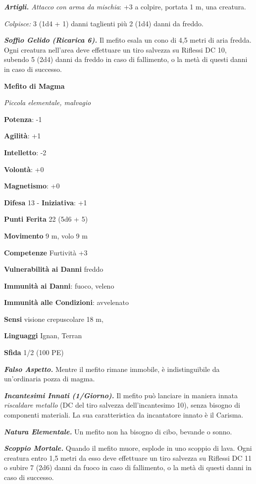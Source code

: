 \begin{multicols}{2}
\emph{\textbf{Artigli.} Attacco con arma da mischia}: +3 a colpire,
portata 1 m, una creatura.

\emph{Colpisce:} 3 (1d4 + 1) danni taglienti più 2 (1d4) danni da
freddo.

\emph{\textbf{Soffio Gelido (Ricarica 6).}} Il mefito esala un cono di
4,5 metri di aria fredda. Ogni creatura nell'area deve effettuare un
tiro salvezza su Riflessi DC 10, subendo 5 (2d4) danni da freddo in
caso di fallimento, o la metà di questi danni in caso di successo.

\textbf{Mefito di Magma}

\emph{Piccola elementale, malvagio}

\textbf{Potenza}: -1

\textbf{Agilità}: +1

\textbf{Intelletto}: -2

\textbf{Volontà}: +0

\textbf{Magnetismo}: +0

\textbf{Difesa} 13 - \textbf{Iniziativa}: +1

\textbf{Punti Ferita} 22 (5d6 + 5)

\textbf{Movimento} 9 m, volo 9 m

\textbf{Competenze} Furtività +3

\textbf{Vulnerabilità ai Danni} freddo

\textbf{Immunità ai Danni}: fuoco, veleno

\textbf{Immunità alle Condizioni}: avvelenato

\textbf{Sensi} visione crepuscolare 18 m, 

\textbf{Linguaggi} Ignan, Terran

\textbf{Sfida} 1/2 (100 PE)\smallskip

\emph{\textbf{Falso Aspetto.}} Mentre il mefito rimane immobile, è
indistinguibile da un'ordinaria pozza di magma.

\emph{\textbf{Incantesimi Innati (1/Giorno).}} Il mefito può lanciare in
maniera innata \emph{riscaldare metallo} (DC del tiro salvezza
dell'incantesimo 10), senza bisogno di componenti materiali. La sua
caratteristica da incantatore innato è il Carisma.

\emph{\textbf{Natura Elementale.}} Un mefito non ha bisogno di cibo,
bevande o sonno.

\emph{\textbf{Scoppio Mortale.}} Quando il mefito muore, esplode in uno
scoppio di lava. Ogni creatura entro 1,5 metri da esso deve effettuare
un tiro salvezza su Riflessi DC 11 o subire 7 (2d6) danni da fuoco in
caso di fallimento, o la metà di questi danni in caso di successo.


\end{multicols}

